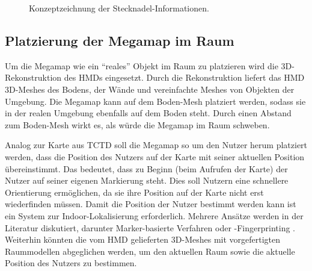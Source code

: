 \begin{figure}[bth]
	\centering
	\caption{Konzeptzeichnung der Stecknadel-Informationen.}
	\label{fig:concept_pin_info}
\end{figure}

\subsection{Platzierung der Megamap im Raum}
Um die Megamap wie ein \enquote{reales} Objekt im Raum zu platzieren wird die 3D-Rekonstruktion des HMDs eingesetzt.
Durch die Rekonstruktion liefert das HMD 3D-Meshes des Bodens, der Wände und vereinfachte Meshes von Objekten der Umgebung.
Die Megamap kann auf dem Boden-Mesh platziert werden, sodass sie in der realen Umgebung ebenfalls auf dem Boden steht.
Durch einen Abstand zum Boden-Mesh wirkt es, als würde die Megamap im Raum schweben.

Analog zur Karte aus TCTD soll die Megamap so um den Nutzer herum platziert werden, dass die Position des Nutzers auf der Karte mit seiner aktuellen Position übereinstimmt.
Das bedeutet, dass zu Beginn (beim Aufrufen der Karte) der Nutzer auf seiner eigenen Markierung steht.
Dies soll Nutzern eine schnellere Orientierung ermöglichen, da sie ihre Position auf der Karte nicht erst wiederfinden müssen.
Damit die Position der Nutzer bestimmt werden kann ist ein System zur Indoor-Lokalisierung erforderlich.
Mehrere Ansätze werden in der Literatur diskutiert, darunter Marker-basierte Verfahren \parencite{bibid} oder \wifi-Fingerprinting \parencite{bibid} .
Weiterhin könnten die vom HMD gelieferten 3D-Meshes mit vorgefertigten Raummodellen abgeglichen werden, um den aktuellen Raum sowie die aktuelle Position des Nutzers zu bestimmen.

